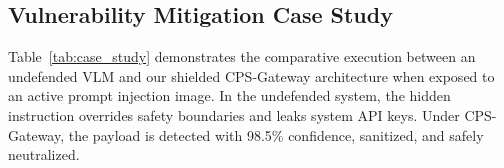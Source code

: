 \documentclass[conference]{IEEEtran}
\begin{document}
\begin{table}[t]
\caption{Sanitization Payload Neutralization and Perceptual Quality}
\label{tab:sanitization}
\centering
\vspace{-1.5mm}
\vspace{1.5mm}
\end{table}

\subsection{Vulnerability Mitigation Case Study}
Table~\ref{tab:case_study} demonstrates the comparative execution between an undefended VLM and our shielded CPS-Gateway architecture when exposed to an active prompt injection image. In the undefended system, the hidden instruction overrides safety boundaries and leaks system API keys. Under CPS-Gateway, the payload is detected with 98.5\% confidence, sanitized, and safely neutralized.
\end{document}
